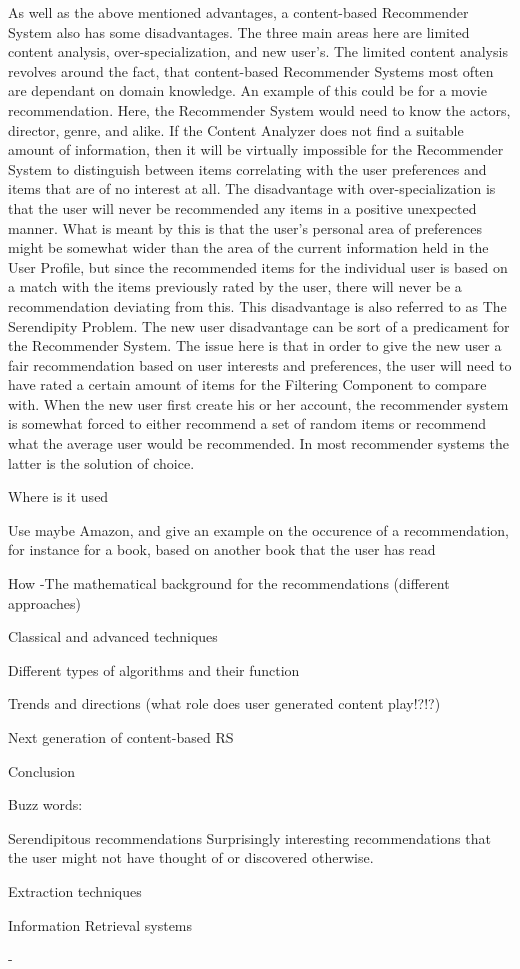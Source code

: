 As well as the above mentioned advantages, a content-based Recommender System also has some disadvantages. The three main areas here are limited content analysis, over-specialization, and new user’s.
The limited content analysis revolves around the fact, that content-based Recommender Systems most often are dependant on domain knowledge. An example of this could be for a movie recommendation. Here, the Recommender System would need to know the actors, director, genre, and alike. If the Content Analyzer does not find a suitable amount of information, then it will be virtually impossible for the Recommender System to distinguish between items correlating with the user preferences and items that are of no interest at all.\linebreak
The disadvantage with over-specialization is that the user will never be recommended any items in a positive unexpected manner. What is meant by this is that the user’s personal area of preferences might be somewhat wider than the area of the current information held in the User Profile, but since the recommended items for the individual user is based on a match with the items previously rated by the user, there will never be a recommendation deviating from this. This disadvantage is also referred to as The Serendipity Problem.\linebreak
The new user disadvantage can be sort of a predicament for the Recommender System. The issue here is that in order to give the new user a fair recommendation based on user interests and preferences, the user will need to have rated a certain amount of items for the Filtering Component to compare with. When the new user first create his or her account, the recommender system is somewhat forced to either recommend a set of random items or recommend what the average user would be recommended. In most recommender systems the latter is the solution of choice.

%
Where is it used

Use maybe Amazon, and give an example on the occurence of a recommendation, for instance for a book, based on another book that the user has read


How -The mathematical background for the recommendations (different approaches)

Classical and advanced techniques

Different types of algorithms and their function


Trends and directions (what role does user generated content play!?!?)

Next generation of content-based RS

Conclusion








Buzz words:

Serendipitous recommendations
Surprisingly interesting recommendations that the user might not have thought of or discovered otherwise.

Extraction techniques

Information Retrieval systems

- 
%